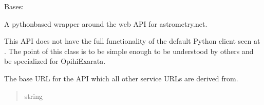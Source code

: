 \documentclass[letterpaper,11pt,english]{sphinxmanual}
\begin{document}
\begin{savenotes}\begin{fulllineitems}
\label{\detokenize{code/opihiexarata.astrometry.webclient:opihiexarata.astrometry.webclient.AstrometryNetWebAPIEngine}}
\pysigstartsignatures
{}
\pysigstopsignatures
\sphinxAtStartPar
Bases: {\hyperref[\detokenize{code/opihiexarata.library.engine:opihiexarata.library.engine.AstrometryEngine}]{}}

\sphinxAtStartPar
A python\sphinxhyphen{}based wrapper around the web API for astrometry.net.

\sphinxAtStartPar
This API does not have the full functionality of the default Python client
seen at .
The point of this class is to be simple enough to be understood by others and
be specialized for OpihiExarata.

\begin{savenotes}\begin{fulllineitems}
\label{\detokenize{code/opihiexarata.astrometry.webclient:opihiexarata.astrometry.webclient.AstrometryNetWebAPIEngine._ASTROMETRY_NET_API_BASE_URL}}
\pysigstartsignatures
{}
\pysigstopsignatures
\sphinxAtStartPar
The base URL for the API which all other service URLs are derived from.
\begin{quote}\begin{description}
\sphinxAtStartPar
string

\end{description}\end{quote}


\end{fulllineitems}
\end{savenotes}
\end{fulllineitems}
\end{savenotes}
\end{document}
